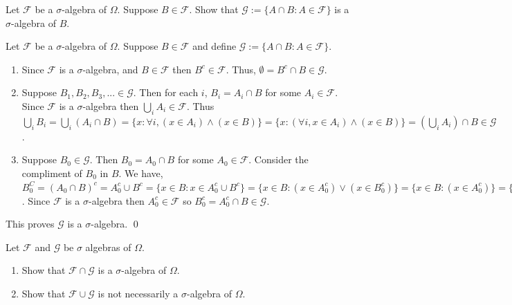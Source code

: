 \documentclass[10pt]{article}
\begin{document}
\maketitle


\begin{problem}[Exercise 1.1]
Let \( \mathcal{F} \) be a \( \sigma \)-algebra of \( \Omega \). Suppose \( B\in\mathcal{F} \). Show that \( \mathcal{G}:=\{A\cap B : A\in\mathcal{F}\} \) is a \( \sigma \)-algebra of \( B \).
\end{problem}

\begin{solution}[Solution]
Let \( \mathcal{F} \) be a \( \sigma \)-algebra of \( \Omega \). Suppose \( B\in\mathcal{F} \) and define \( \mathcal{G}:=\{A\cap B : A\in\mathcal{F}\} \).
\begin{enumerate}
    \item[(i)] Since \( \mathcal{F} \) is a \( \sigma \)-algebra, and \( B\in\mathcal{F} \) then \( B^c\in\mathcal{F} \). Thus, \( \emptyset = B^c\cap B \in\mathcal{G} \).
    \item[(ii)] Suppose \( B_1, B_2, B_3, ... \in\mathcal{G} \). Then for each \( i \), \( B_i = A_i\cap B \) for some \( A_i\in\mathcal{F} \). Since \( \mathcal{F} \) is a \( \sigma \)-algebra then \( \bigcup_iA_i\in\mathcal{F} \). Thus \( \bigcup_i B_i = \bigcup_i (A_i\cap B) = \{x : \forall i, (x\in A_i)\wedge (x\in B) \} = \{ x : (\forall i, x\in A_i)\wedge(x\in B) \} =  \left(\bigcup_iA_i\right)\cap B \in\mathcal{G} \).
    \item[(iii)] Suppose \( B_0\in\mathcal{G} \). Then \( B_0=A_0\cap B \) for some \( A_0\in\mathcal{F} \). Consider the compliment of \( B_0 \) in \( B \). We have,  \( B_0^C = (A_0\cap B)^c = A_0^c\cup B^c = \{ x\in B : x\in A_0^c\cup B^c \} = \{ x\in B: (x\in A_0^c)\vee(x\in B_0^c) \} = \{ x\in B : (x\in A_0^c)\} = \{ x\in \Sigma : (x\in A_0^c)\wedge (x\in B)) \} = A_0^c\cap B \). Since \( \mathcal{F} \) is a \( \sigma \)-algebra then \( A_0^c\in\mathcal{F} \) so \( B_0^c = A_0^c\cap B\in\mathcal{G} \).
\end{enumerate} 
This proves \( \mathcal{G} \) is a \( \sigma \)-algebra. \qed

\end{solution}

\begin{problem}[Exercise 1.2]
Let \( \mathcal{F} \) and \( \mathcal{G} \) be \( \sigma \) algebras of \( \Omega \).
\begin{enumerate}
	\item[(a)] Show that \( \mathcal{F}\cap\mathcal{G} \) is a \( \sigma \)-algebra of \( \Omega \).
	\item[(b)] Show that \( \mathcal{F}\cup\mathcal{G} \) is not necessarily a \( \sigma \)-algebra of \( \Omega \).
\end{enumerate}
\end{problem}
\end{document}

